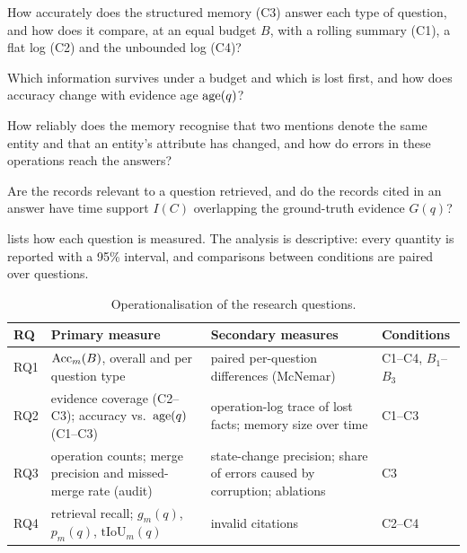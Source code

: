 \begin{description}[style=nextline,leftmargin=2.2em]
\item[RQ1 (accuracy and organisation).]
How accurately does the structured memory (C3) answer each type of question,
and how does it compare, at an equal budget $B$, with a rolling summary (C1),
a flat log (C2) and the unbounded log (C4)?
\item[RQ2 (what is kept and lost).]
Which information survives under a budget and which is lost first, and how
does accuracy change with evidence age $\operatorname{age}(q)$?
\item[RQ3 (updating).]
How reliably does the memory recognise that two mentions denote the same
entity and that an entity's attribute has changed, and how do errors in these
operations reach the answers?
\item[RQ4 (retrieval and grounding).]
Are the records relevant to a question retrieved, and do the records cited in
an answer have time support $I(C)$ overlapping the ground-truth evidence
$G(q)$?
\end{description}

 lists how each question is measured. The analysis is
descriptive: every quantity is reported with a 95\% interval, and comparisons
between conditions are paired over questions.

\begin{table}[ht]
\centering\small
\caption{Operationalisation of the research questions.}\label{tab:rq-ops}
\begin{tabularx}{\linewidth}{@{}lXXl@{}}
\toprule
RQ & Primary measure & Secondary measures & Conditions \\
\midrule
RQ1 & $\mathrm{Acc}_m(B)$, overall and per question type & paired per-question
  differences (McNemar) & C1--C4, $B_1$--$B_3$ \\
RQ2 & evidence coverage (C2--C3); accuracy vs.\ $\operatorname{age}(q)$ (C1--C3) &
  operation-log trace of lost facts; memory size over time & C1--C3 \\
RQ3 & operation counts; merge precision and missed-merge rate (audit) &
  state-change precision; share of errors caused by corruption; ablations & C3 \\
RQ4 & retrieval recall; $g_m(q)$, $p_m(q)$, $\mathrm{tIoU}_m(q)$ & invalid citations & C2--C4 \\
\bottomrule
\end{tabularx}
\end{table}

